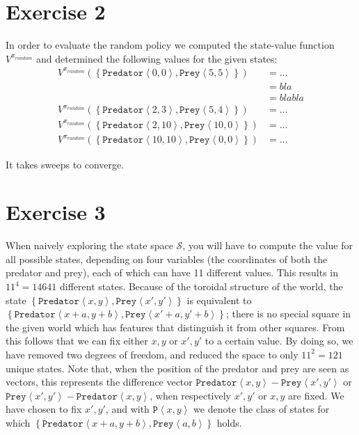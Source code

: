 \documentclass[a4paper,11pt]{article}
\newcommand{\Pred}[2]{\ensuremath{\mathtt{Predator}\left<#1, #2\right>}}
\newcommand{\Prey}[2]{\ensuremath{\mathtt{Prey}\left<#1, #2\right>}}
\newcommand{\p}[2]{\ensuremath{\mathtt{P}\left<#1, #2\right>}}
\newcommand{\DrawSmallPred}[2]{\node at (A.center #1 #2) {$\pi$};}
\newcommand{\DrawSmallPrey}[2]{\node at (A.center #1 #2) {P};}
\begin{document}
\section*{Exercise 2}
In order to evaluate the random policy we computed the state-value function $V^{\pi_{random}}$ and determined the following values for the given states:\\

\begin{align*}
V^{\pi_{random}}(\left\{\Pred{0}{0},\Prey{5}{5}\right\}) & = \ldots \\
&= bla \\
&= blabla\\
    V^{\pi_{random}}(\left\{\Pred{2}{3},\Prey{5}{4}\right\}) &= \ldots \\
    V^{\pi_{random}}(\left\{\Pred{2}{10},\Prey{10}{0}\right\}) &= \ldots \\
    V^{\pi_{random}}(\left\{\Pred{10}{10},\Prey{0}{0}\right\}) &= \ldots
\end{align*}

It takes %
sweeps to converge.



\section*{Exercise 3}
When naively exploring the state space $\mathcal{S}$, you will have to compute the value for all possible states, depending on four variables (the coordinates of both the predator and prey), each of which can have 11 different values.  This results in $11^4 = 14641$ different states.  Because of the toroidal structure of the world, the state $\left\{\Pred{x}{y}, \Prey{x'}{y'}\right\}$ is equivalent to $\left\{\Pred{x+a}{y+b}, \Prey{x'+a}{y'+b}\right\}$; there is no special square in the given world which has features that distinguish it from other squares.  From this follows that we can fix either $x, y$ or $x', y'$ to a certain value.  By doing so, we have removed two degrees of freedom, and reduced the space to only $11^2 = 121$ unique states.  Note that, when the position of the predator and prey are seen as vectors, this represents the difference vector $\Pred{x}{y} - \Prey{x'}{y'}$ or $\Prey{x'}{y'} - \Pred{x}{y}$, when respectively $x', y'$ or $x, y$ are fixed.  We have chosen to fix $x', y'$, and with $\p{x}{y}$ we denote the class of states for which $\left\{\Pred{x+a}{y+b}, \Prey{a}{b}\right\}$ holds.

\begin{figure}
\begin{center}
\end{center}
\end{figure}
\end{document}
